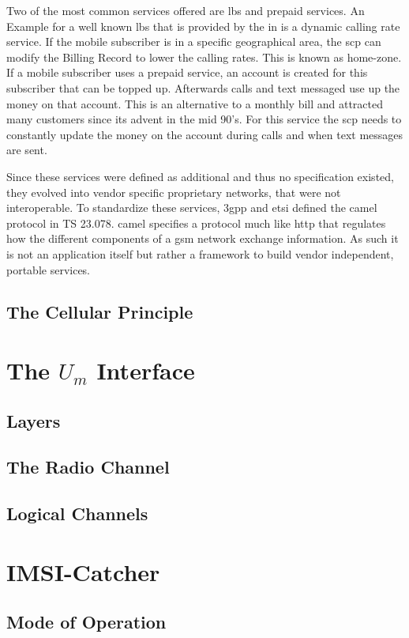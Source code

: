 Two of the most common services offered are \gls{lbs} and prepaid services.
An Example for a well known \gls{lbs} that is provided by the \gls{in} is a dynamic calling rate service.
If the mobile subscriber is in a specific geographical area, the \gls{scp} can modify the Billing Record to lower the calling rates.
This is known as home-zone.
If a mobile subscriber uses a prepaid service, an account is created for this subscriber that can be topped up.
Afterwards calls and text messaged use up the money on that account.
This is an alternative to a monthly bill and attracted many customers since its advent in the mid 90's.
For this service the \gls{scp} needs to constantly update the money on the account during calls and when text messages are sent.

Since these services were defined as additional and thus no specification existed, they evolved into vendor specific proprietary networks, that were not interoperable.
To standardize these services, \gls{3gpp} and \gls{etsi} defined the \gls{camel} protocol in TS 23.078\cite{GSM23078}.
\gls{camel} specifies a protocol much like \gls{http} that regulates how the different components of a \gls{gsm} network exchange information.
As such it is not an application itself but rather a framework to build vendor independent, portable services.
\subsection{The Cellular Principle}
\section{The $U_m$ Interface}
\label{sec:Um}
\subsection{Layers}
\subsection{The Radio Channel}
\subsection{Logical Channels}
\section{IMSI-Catcher}
\label{sec:catcher}
\subsection{Mode of Operation}
